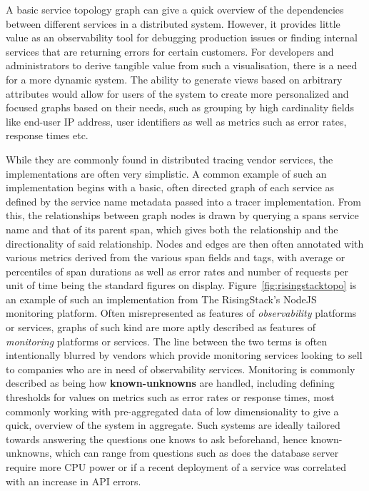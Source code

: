 \documentclass[12pt,pdftex,titlepage]{report}
\begin{document}
                A basic service topology graph can give a quick overview of the dependencies between different services in a distributed system. However, it provides little value as an observability tool
                for debugging production issues or finding internal services that are returning errors for certain customers. For developers and administrators to derive tangible value from such a 
                visualisation, there is a need for a more dynamic system. The ability to generate views based on arbitrary attributes would allow for users of the system to create more personalized and 
                focused graphs based on their needs, such as grouping by high cardinality fields like end-user IP address, user identifiers as well as metrics such as error rates, response times 
                etc\cite{doingitwrongtopo}.

                While they are commonly found in distributed tracing vendor services, the implementations are often very simplistic. A common example of such an implementation begins with a basic, often directed
                graph of each service as defined by the service name metadata passed into a tracer implementation. From this, the relationships between graph nodes is drawn by querying a spans service name
                and that of its parent span, which gives both the relationship and the directionality of said relationship. Nodes and edges are then often annotated with various metrics derived from the various
                span fields and tags, with average or percentiles of span durations as well as error rates and number of requests per unit of time being the standard figures on display. Figure~\ref{fig:risingstacktopo}
                is an example of such an implementation from The RisingStack's NodeJS monitoring platform. Often misrepresented as features of \textit{observability} platforms or services, graphs of such kind are
                more aptly described as features of \textit{monitoring} platforms or services. The line between the two terms is often intentionally blurred by vendors which provide monitoring services looking to sell
                to companies who are in need of observability services. Monitoring is commonly described as being how \textbf{known-unknowns} are handled, including defining thresholds for values on metrics such as
                error rates or response times, most commonly working with pre-aggregated data of low dimensionality to give a quick, overview of the system in aggregate. Such systems are ideally tailored towards 
                answering the questions one knows to ask beforehand, hence known-unknowns, which can range from questions such as does the database server require more CPU power or if a recent deployment of a service
                was correlated with an increase in API errors. 
\end{document}
